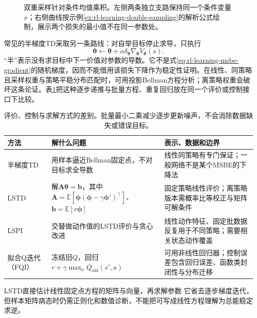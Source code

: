 \begin{figure}[t]
  \centering
  
  \caption{双重采样针对条件均值乘积。左侧两条独立支路保持同一个条件变量$x$；右侧曲线按示例\ref{ex:rl-learning-double-sampling}的解析公式绘制，展示两个损失的最小值不在同一参数处。}
  \label{fig:rl-learning-double-sampling}
\end{figure}

常见的半梯度TD采取另一条路线：对自举目标停止求导，只执行
\[
  \bm{\theta}\leftarrow\bm{\theta}
       +\alpha\delta_{\bm{\theta}}
                    \nabla_{\bm{\theta}}V_{\bm{\theta}}(s).
\]
“半”表示没有求目标中下一价值对参数的导数。它不是式\eqref{eq:rl-learning-msbe-gradient}的随机梯度，因而不能借用该损失下降作为稳定性证明。在线性、同策略且采样权重与策略平稳分布匹配时，可用投影Bellman方程分析；离策略权重会破坏这条论证。表\ref{tab:rl-learning-fitted-methods}把这种逐步递推与批量方程、重复回归放在同一个评价或控制接口下比较。

\begin{table}[t]
  \centering
  \small
  \begin{tabularx}{\linewidth}{>{\raggedright\arraybackslash}p{23mm} >{\raggedright\arraybackslash}X >{\raggedright\arraybackslash}X}
    \toprule
    方法 & 解什么问题 & 表示、数据和边界 \\
    \midrule
    半梯度TD & 用样本逼近Bellman固定点，不对目标求全导数 & 线性同策略有专门保证；一般网络不是某个MSBE的下降法 \\
    LSTD & 解$\bm{A}\bm{\theta}=\bm{b}$，其中$\bm{A}=\mathbb E[\bm{\phi}(\bm{\phi}-\gamma\bm{\phi}')^\top]$、$\bm{b}=\mathbb E[r\bm{\phi}]$ & 固定策略线性评价；离策略版本需概率比等校正与矩阵可解条件 \\
    LSPI & 交替做动作值的LSTD评价与贪心改进 & 线性动作特征、固定批数据反复用于不同策略；需要相关状态动作覆盖 \\
    拟合Q迭代（FQI） & 冻结旧$Q$，回归$r+\gamma\max_aQ_{\mathrm{old}}(s',a)$ & 可用非线性回归器；控制误差包含回归误差、函数类封闭性与分布迁移 \\
    \bottomrule
  \end{tabularx}
  \caption{评价、控制与求解方式的差别。批量最小二乘减少逐步更新噪声，不会消除数据缺失或错误目标。}
  \label{tab:rl-learning-fitted-methods}
\end{table}

LSTD直接估计线性固定点方程的矩阵与向量，再求解参数
它省去逐步梯度迭代，但样本矩阵病态时仍需正则化和数值诊断，不能把可写成线性方程理解为总能稳定求逆。

